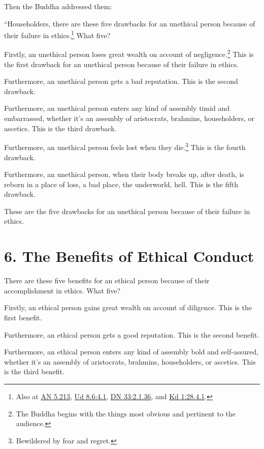 \documentclass[12pt,openany]{book}%
\begin{document}
Then the Buddha addressed them: 

“Householders, there are these five drawbacks for an unethical person because of their failure in ethics.\footnote{Also at \href{https://suttacentral.net/an5.213/en/sujato}{AN 5.213}, \href{https://suttacentral.net/ud8.6/en/sujato\#4.1}{Ud 8.6:4.1}, \href{https://suttacentral.net/dn33/en/sujato\#2.1.36}{DN 33:2.1.36}, and \href{https://suttacentral.net/pli-tv-kd1/en/sujato\#28.4.1}{Kd 1:28.4.1}. } What five? 

Firstly, an unethical person loses great wealth on account of negligence.\footnote{The Buddha begins with the things most obvious and pertinent to the audience. } This is the first drawback for an unethical person because of their failure in ethics. 

Furthermore, an unethical person gets a bad reputation. This is the second drawback. 

Furthermore, an unethical person enters any kind of assembly timid and embarrassed, whether it’s an assembly of aristocrats, brahmins, householders, or ascetics. This is the third drawback. 

Furthermore, an unethical person feels lost when they die.\footnote{Bewildered by fear and regret. } This is the fourth drawback. 

Furthermore, an unethical person, when their body breaks up, after death, is reborn in a place of loss, a bad place, the underworld, hell. This is the fifth drawback. 

These are the five drawbacks for an unethical person because of their failure in ethics. 

\section*{6. The Benefits of Ethical Conduct }

There are these five benefits for an ethical person because of their accomplishment in ethics. What five? 

Firstly, an ethical person gains great wealth on account of diligence. This is the first benefit. 

Furthermore, an ethical person gets a good reputation. This is the second benefit. 

Furthermore, an ethical person enters any kind of assembly bold and self-assured, whether it’s an assembly of aristocrats, brahmins, householders, or ascetics. This is the third benefit. 
\end{document}

